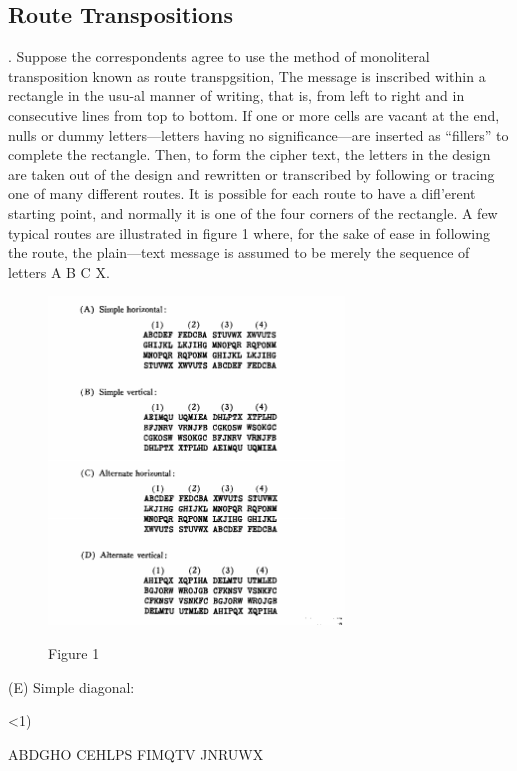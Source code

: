 \subsection{Route Transpositions}

\mypara. Suppose the correspondents agree to use the method of monoliteral
transposition known as route transpgsition, The message is inscribed 
within a rectangle in the usu-al manner of writing, that is, from left to
right and in consecutive lines from top to bottom. If one or more cells
are vacant at the end, nulls or dummy letters—letters having no significance—are inserted as “fillers” to complete the rectangle. Then, to form
the cipher text, the letters in the design are taken out of the design and
rewritten or transcribed by following or tracing one of many different
routes. It is possible for each route to have a diﬂ’erent starting point, and
normally it is one of the four corners of the rectangle. A few typical
routes are illustrated in figure 1 where, for the sake of ease in following
the route, the plain—text message is assumed to be merely the sequence
of letters A B C X.

\begin{figure}[h]
  \centering
    \includegraphics[width=0.7\textwidth,natwidth=598,natheight=663]{Chapter1_fig1.png}
    \label{Figure 1}
    \caption{Figure 1}
\end{figure}


(E) Simple diagonal:

<1)

ABDGHO
CEHLPS
FIMQTV
JNRUWX

